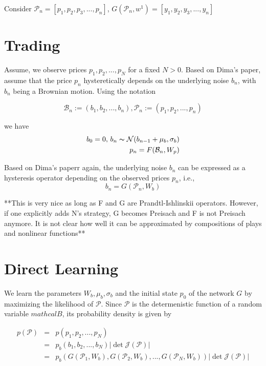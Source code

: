 \documentclass[11pt]{article}
\begin{document}
Consider \(\mathcal{P}_{n} = [p_{1}, p_{2}, p_{3}, ..., p_{n}]\), \(G(\mathcal{P}_{n}, w^{1}) = [y_{1}, y_{2}, y_{3}, ..., y_{n}]\)

\section{Trading}
\label{sec:org9e99024}
Assume, we observe prices \(p_1, p_2, ..., p_N\) for a fixed \(N > 0\). Based on Dima's paper,
assume that the price \(p_{n}\) hysteretically depends on the underlying noise \(b_n\), with \(b_n\) being a
Brownian motion. Using the notation

\[\mathcal{B}_n := (b_1, b_2, ..., b_n), \mathcal{P}_n := (p_1, p_2, ..., p_n)\]

we have
\begin{eqnarray}
b_{0} = 0, \, b_{n} \thicksim \mathcal{N} (b_{n-1} + \mu_{b}, \sigma_{b}) \\
p_{n} = F(\mathcal{B}_n, W_{p})
\end{eqnarray}


Based on Dima's paperr again, the underlying noise \(b_n\) can be expressed as a hysteresis operator depending on
the observed prices \(p_n\), i.e.,
\[b_n=G(\mathcal{P}_n, W_b)\]


**This is very nice as long as F and G are Prandtl-Ishlinskii operators. However, if one explicitly adds N's strategy,
G becomes Preisach and F is not Preisach anymore. It is not clear how well it can be approximated by compositions of
plays and nonlinear functions**


\section{Direct Learning}
\label{sec:org31a8072}
We learn the parameters \(W_b, \mu_b, \sigma_b\) and the initial state \(p_0\) of the network \(G\) by maximizing
the likelihood of \(\mathcal{P}\). Since \(\mathcal{P}\) is the determenistic function of a random variable
\(mathcal{B}\), its probability density is given by

\begin{eqnarray}
p(\mathcal{P}) &=& p(p_1, p_2, ..., p_N) \\
               &=& p_b(b_1, b_2, ..., b_N) \left|\det \mathcal{J(P)}\right| \\
               &=& p_b(G(\mathcal{P}_1, W_b), G(\mathcal{P}_2, W_b), ..., G(\mathcal{P}_N, W_b)) \left|\det \mathcal{J(P)}\right|
\end{eqnarray}
\end{document}
